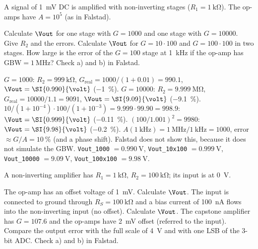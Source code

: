 \label{ex:opamp-gain}
A signal of \SI{1}{\milli\volt} DC is amplified with non-inverting stages
($R_1 = \SI{1}{\kilo\ohm}$). The op-amps have $A = 10^5$ (as in Falstad).
\begin{talist}
\ta Calculate $\Vout$ for one stage with $G=1000$ and one stage with $G=10000$. Give $R_2$ and the errors.
\ta Calculate $\Vout$ for $G = 10\cdot 100$ and $G = 100\cdot 100$ in two stages.
\ta How large is the error of the $G=100$ stage at \SI{1}{\kilo\hertz} if the op-amp has $\mathrm{GBW} = \SI{1}{\mega\hertz}$?
\ta Check a) and b) in Falstad.
\end{talist}

\begin{solution}
\begin{talist}
\ta $G=1000$: $R_2 = \SI{999}{\kilo\ohm}$, $G_\mathrm{real} = 1000/(1+0.01) = 990.1$,
    $\Vout = \SI{0.990}{\volt}$ (\SI{-1}{\percent}).
    $G=10000$: $R_2 = \SI{9.999}{\mega\ohm}$, $G_\mathrm{real} = 10000/1.1 = 9091$, $\Vout = \SI{9.09}{\volt}$ (\SI{-9.1}{\percent}).
\ta $10/(1+10^{-4})\cdot 100/(1+10^{-3}) = 9.999\cdot 99.90 = 998.9$: $\Vout = \SI{0.999}{\volt}$ (\SI{-0.11}{\percent}).
    $(100/1.001)^2 = 9980$: $\Vout = \SI{9.98}{\volt}$ (\SI{-0.2}{\percent}).
\ta $A(\SI{1}{\kilo\hertz}) = \SI{1}{\mega\hertz}/\SI{1}{\kilo\hertz} = 1000$, error $\approx G/A = \SI{10}{\percent}$
    (and a phase shift). Falstad does not show this, because it does not simulate the GBW.
\ta {}\newline \texttt{Vout\_1000} $=\SI{0.990}{\volt}$, \texttt{Vout\_10x100} $=\SI{0.999}{\volt}$,\newline
    \texttt{Vout\_10000} $=\SI{9.09}{\volt}$, \texttt{Vout\_100x100} $=\SI{9.98}{\volt}$.
\end{talist}
\end{solution}

\label{ex:opamp-offset}
A non-inverting amplifier has $R_1 = \SI{1}{\kilo\ohm}$, $R_2 = \SI{100}{\kilo\ohm}$; its input is at \SI{0}{\volt}.
\begin{talist}
\ta The op-amp has an offset voltage of \SI{1}{\milli\volt}. Calculate $\Vout$.
\ta The input is connected to ground through $R_S = \SI{100}{\kilo\ohm}$ and a bias current
    of \SI{100}{\nano\ampere} flows into the non-inverting input (no offset). Calculate $\Vout$.
\ta The capstone amplifier has $G = 107.6$ and the op-amps have \SI{2}{\milli\volt} offset (referred to the input).
    Compare the output error with the full scale of \SI{4}{\volt} and with one LSB of the 3-bit ADC.
\ta Check a) and b) in Falstad.
\end{talist}


